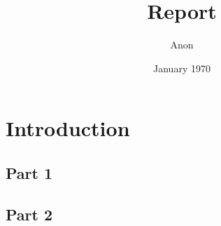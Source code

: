 \documentclass[12pt]{report}
\title{Report}
\author{Anon}
\date{January 1970}
\begin{document}
    \maketitle

    \tableofcontents

    \titleformat{\chapter}[display]
    {\normalfont\bfseries\Huge}{}{0pt}{\thechapter\quad}
    \titlespacing*{\chapter}{0pt}{50pt}{20pt}

    \chapter{Introduction}
    
        \section{Part 1}
        \section{Part 2}
\end{document}
